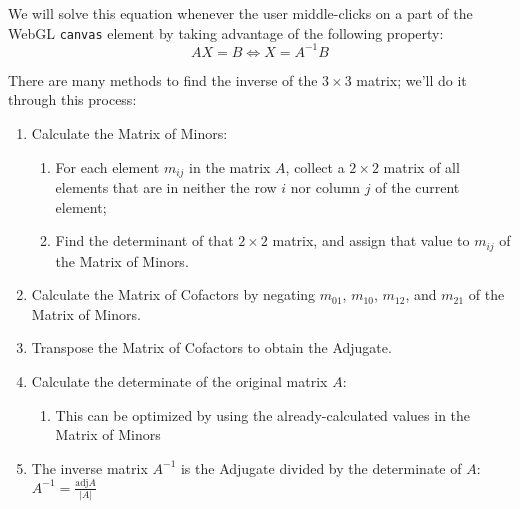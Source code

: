 \par We will solve this equation whenever the user middle-clicks on a part of the WebGL \texttt{canvas} element by taking advantage of the following property:
    \begin{equation}
    AX=B \iff X=A^{-1}B
    \end{equation}
\par There are many methods to find the inverse of the $3 \times 3$ matrix; we'll do it through this process: \cite{matlinsys}
\begin{enumerate}
    \item Calculate the Matrix of Minors:
        \begin{enumerate}
        \item For each element $m_{ij}$ in the matrix $A$, collect a $2 \times 2$ matrix of all elements that are in neither the row $i$ nor column $j$ of the current element;
        \item Find the determinant of that $2 \times 2$ matrix, and assign that value to $m_{ij}$ of the Matrix of Minors.
        \end{enumerate}
    \item Calculate the Matrix of Cofactors by negating $m_{01}$, $m_{10}$, $m_{12}$, and $m_{21}$ of the Matrix of Minors.
    \item Transpose the Matrix of Cofactors to obtain the Adjugate.
    \item Calculate the determinate of the original matrix $A$:
        \begin{enumerate}
        \item This can be optimized by using the already-calculated values in the Matrix of Minors
        \end{enumerate}
    \item The inverse matrix $A^{-1}$ is the Adjugate divided by the determinate of $A$: $A^{-1}=\frac{\text{adj}A}{|A|}$

\end{enumerate}
